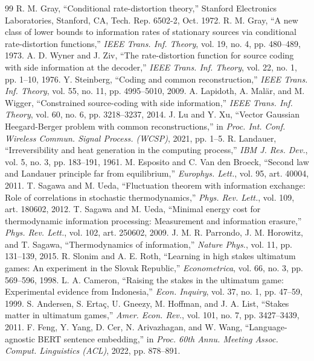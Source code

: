 \documentclass[11pt,onecolumn]{IEEEtran}
\begin{document}
\begin{thebibliography}{99}
 R. M. Gray, ``Conditional rate-distortion theory,'' Stanford Electronics Laboratories, Stanford, CA, Tech. Rep. 6502-2, Oct. 1972.
 R. M. Gray, ``A new class of lower bounds to information rates of stationary sources via conditional rate-distortion functions,'' \emph{IEEE Trans. Inf. Theory}, vol. 19, no. 4, pp. 480--489, 1973.
 A. D. Wyner and J. Ziv, ``The rate-distortion function for source coding with side information at the decoder,'' \emph{IEEE Trans. Inf. Theory}, vol. 22, no. 1, pp. 1--10, 1976.
 Y. Steinberg, ``Coding and common reconstruction,'' \emph{IEEE Trans. Inf. Theory}, vol. 55, no. 11, pp. 4995--5010, 2009.
 A. Lapidoth, A. Mal\"ar, and M. Wigger, ``Constrained source-coding with side information,'' \emph{IEEE Trans. Inf. Theory}, vol. 60, no. 6, pp. 3218--3237, 2014.
 J. Lu and Y. Xu, ``Vector Gaussian Heegard-Berger problem with common reconstructions,'' in \emph{Proc. Int. Conf. Wireless Commun. Signal Process. (WCSP)}, 2021, pp. 1--5.
 R. Landauer, ``Irreversibility and heat generation in the computing process,'' \emph{IBM J. Res. Dev.}, vol. 5, no. 3, pp. 183--191, 1961.
 M. Esposito and C. Van den Broeck, ``Second law and Landauer principle far from equilibrium,'' \emph{Europhys. Lett.}, vol. 95, art. 40004, 2011.
 T. Sagawa and M. Ueda, ``Fluctuation theorem with information exchange: Role of correlations in stochastic thermodynamics,'' \emph{Phys. Rev. Lett.}, vol. 109, art. 180602, 2012.
 T. Sagawa and M. Ueda, ``Minimal energy cost for thermodynamic information processing: Measurement and information erasure,'' \emph{Phys. Rev. Lett.}, vol. 102, art. 250602, 2009.
 J. M. R. Parrondo, J. M. Horowitz, and T. Sagawa, ``Thermodynamics of information,'' \emph{Nature Phys.}, vol. 11, pp. 131--139, 2015.
 R. Slonim and A. E. Roth, ``Learning in high stakes ultimatum games: An experiment in the Slovak Republic,'' \emph{Econometrica}, vol. 66, no. 3, pp. 569--596, 1998.
 L. A. Cameron, ``Raising the stakes in the ultimatum game: Experimental evidence from Indonesia,'' \emph{Econ. Inquiry}, vol. 37, no. 1, pp. 47--59, 1999.
 S. Andersen, S. Erta\c{c}, U. Gneezy, M. Hoffman, and J. A. List, ``Stakes matter in ultimatum games,'' \emph{Amer. Econ. Rev.}, vol. 101, no. 7, pp. 3427--3439, 2011.
 F. Feng, Y. Yang, D. Cer, N. Arivazhagan, and W. Wang, ``Language-agnostic BERT sentence embedding,'' in \emph{Proc. 60th Annu. Meeting Assoc. Comput. Linguistics (ACL)}, 2022, pp. 878--891.
\end{thebibliography}
\end{document}
